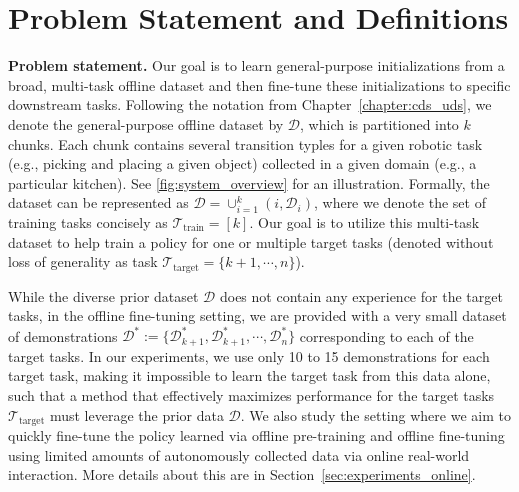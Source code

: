 \vspace{-0.2cm}
\section{Problem Statement and Definitions}
\vspace{-0.2cm}

\textbf{Problem statement.} Our goal is to learn general-purpose initializations from a broad, multi-task offline dataset and then fine-tune these initializations to specific downstream tasks. Following the notation from Chapter~\ref{chapter:cds_uds}, we denote the general-purpose offline dataset by $\mathcal{D}$, which is partitioned into $k$ chunks. Each chunk contains several transition typles for a given robotic task (e.g., picking and placing a given object) collected in a given domain (e.g., a particular kitchen). See \autoref{fig:system_overview} for an illustration. 
Formally, the dataset can be represented as $\mathcal{D} = \cup_{i=1}^k \left(i, \mathcal{D}_i \right)$, where we denote the set of training tasks concisely as $\mathcal{T}_{\text{train}} = [k]$. 
Our goal is to utilize this multi-task dataset to help train a policy for one or multiple target tasks (denoted without loss of generality as task $\mathcal{T}_{\text{target}} = \{k+1, \cdots, n\}$). 

While the diverse prior dataset $\mathcal{D}$ does not contain any experience for the target tasks, in the offline fine-tuning setting, we are provided with a very small dataset of demonstrations $\mathcal{D}^* := \{\mathcal{D}_{k+1}^*, \mathcal{D}^*_{k+1}, \cdots, \mathcal{D}^*_n\}$ corresponding to each of the target tasks. In our experiments, we use only 10 to 15 demonstrations for each target task, making it impossible to learn the target task from this data alone, such that a method that effectively maximizes performance for the target tasks $\mathcal{T}_\text{target}$ must leverage the prior data $\mathcal{D}$. We also study the setting where we aim to quickly fine-tune the policy learned via offline pre-training and offline fine-tuning using limited amounts of autonomously collected data via online real-world interaction. More details about this are in Section~\ref{sec:experiments_online}.
 
